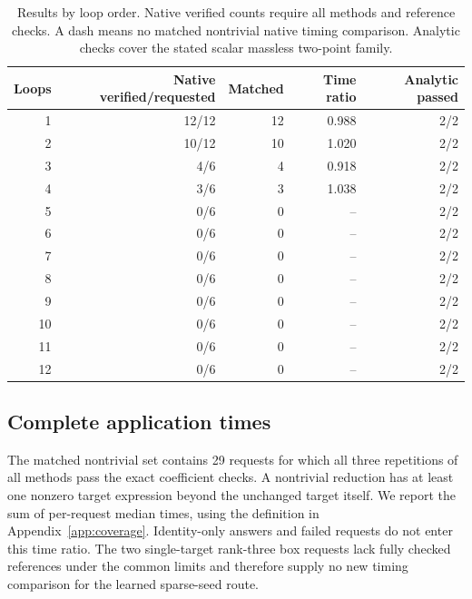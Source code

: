 \begin{table}[!htbp]\centering\small
\caption{Results by loop order. Native verified counts require all methods and reference checks. A dash means no matched nontrivial native timing comparison. Analytic checks cover the stated scalar massless two-point family.}
\label{tab:extended-loops}
\begin{tabular}{@{}rrrrr@{}}\toprule
Loops & Native verified/requested & Matched & Time ratio & Analytic passed\\\midrule
1 & 12/12 & 12 & 0.988 & 2/2\\
2 & 10/12 & 10 & 1.020 & 2/2\\
3 & 4/6 & 4 & 0.918 & 2/2\\
4 & 3/6 & 3 & 1.038 & 2/2\\
5 & 0/6 & 0 & -- & 2/2\\
6 & 0/6 & 0 & -- & 2/2\\
7 & 0/6 & 0 & -- & 2/2\\
8 & 0/6 & 0 & -- & 2/2\\
9 & 0/6 & 0 & -- & 2/2\\
10 & 0/6 & 0 & -- & 2/2\\
11 & 0/6 & 0 & -- & 2/2\\
12 & 0/6 & 0 & -- & 2/2\\
\bottomrule\end{tabular}\end{table}

\subsection{Complete application times}
The matched nontrivial set contains 29 requests for which all three repetitions of all methods pass the exact coefficient checks. A nontrivial reduction has at least one nonzero target expression beyond the unchanged target itself. We report the sum of per-request median times, using the definition in Appendix~\ref{app:coverage}. Identity-only answers and failed requests do not enter this time ratio. The two single-target rank-three box requests lack fully checked references under the common limits and therefore supply no new timing comparison for the learned sparse-seed route.

